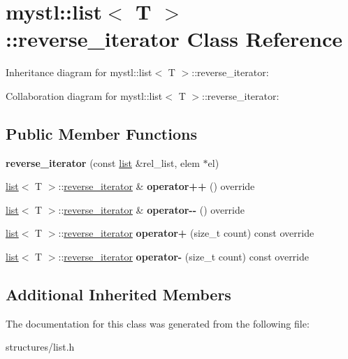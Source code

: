 \hypertarget{classmystl_1_1list_1_1reverse__iterator}{}\section{mystl\+:\+:list$<$ T $>$\+:\+:reverse\+\_\+iterator Class Reference}
\label{classmystl_1_1list_1_1reverse__iterator}


Inheritance diagram for mystl\+:\+:list$<$ T $>$\+:\+:reverse\+\_\+iterator\+:


Collaboration diagram for mystl\+:\+:list$<$ T $>$\+:\+:reverse\+\_\+iterator\+:
\subsection*{Public Member Functions}
\begin{DoxyCompactItemize}
\item 
\mbox{\label{classmystl_1_1list_1_1reverse__iterator_a2eb2bb6be6d90f3fb2246d2cc3a6069e}} 
{\bfseries reverse\+\_\+iterator} (const \hyperlink{classmystl_1_1list}{list} \&rel\+\_\+list, elem $\ast$el)
\item 
\mbox{\label{classmystl_1_1list_1_1reverse__iterator_afc63f57dc8dab304d0d490ec6b136167}} 
\hyperlink{classmystl_1_1list}{list}$<$ T $>$\+::\hyperlink{classmystl_1_1list_1_1reverse__iterator}{reverse\+\_\+iterator} \& {\bfseries operator++} () override
\item 
\mbox{\label{classmystl_1_1list_1_1reverse__iterator_aa52b41bf5c7c64233adfc24dafe685a2}} 
\hyperlink{classmystl_1_1list}{list}$<$ T $>$\+::\hyperlink{classmystl_1_1list_1_1reverse__iterator}{reverse\+\_\+iterator} \& {\bfseries operator-\/-\/} () override
\item 
\mbox{\label{classmystl_1_1list_1_1reverse__iterator_a3570854240ca1e923732bc9d24815c31}} 
\hyperlink{classmystl_1_1list}{list}$<$ T $>$\+::\hyperlink{classmystl_1_1list_1_1reverse__iterator}{reverse\+\_\+iterator} {\bfseries operator+} (size\+\_\+t count) const override
\item 
\mbox{\label{classmystl_1_1list_1_1reverse__iterator_af9eb4b0fe45b8f0c96b2cd3417e0f3e4}} 
\hyperlink{classmystl_1_1list}{list}$<$ T $>$\+::\hyperlink{classmystl_1_1list_1_1reverse__iterator}{reverse\+\_\+iterator} {\bfseries operator-\/} (size\+\_\+t count) const override
\end{DoxyCompactItemize}
\subsection*{Additional Inherited Members}


The documentation for this class was generated from the following file\+:\begin{DoxyCompactItemize}
\item 
structures/list.\+h\end{DoxyCompactItemize}
